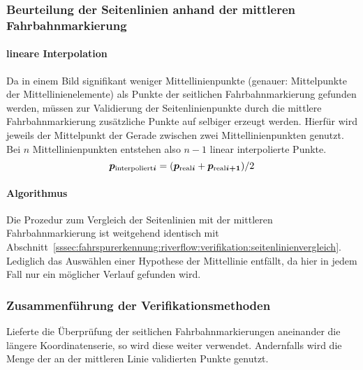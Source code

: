 \subsubsection{Beurteilung der Seitenlinien anhand der mittleren Fahrbahnmarkierung}
\paragraph{lineare Interpolation}
Da in einem Bild signifikant weniger Mittellinienpunkte (genauer: Mittelpunkte der Mittellinienelemente) als Punkte der seitlichen Fahrbahnmarkierung gefunden werden, müssen zur Validierung der Seitenlinienpunkte durch die mittlere Fahrbahnmarkierung zusätzliche Punkte auf selbiger erzeugt werden. Hierfür wird jeweils der Mittelpunkt der Gerade zwischen zwei Mittellinienpunkten genutzt. Bei \( n \) Mittellinienpunkten entstehen also \( n-1 \) linear interpolierte Punkte.
\begin{equation}
\boldsymbol{p_{\text{interpoliert}i}} = (\boldsymbol{p_{\text{real}i}}+\boldsymbol{p_{\text{real}i+1}})/2 
\end{equation}
\paragraph{Algorithmus} Die Prozedur zum Vergleich der Seitenlinien mit der mittleren Fahrbahnmarkierung ist weitgehend identisch mit Abschnitt~\ref{sssec:fahrspurerkennung:riverflow:verifikation:seitenlinienvergleich}. Lediglich das Auswählen einer Hypothese der Mittellinie entfällt, da hier in jedem Fall nur ein möglicher Verlauf gefunden wird.

\subsubsection{Zusammenführung der Verifikationsmethoden}
Lieferte die Überprüfung der seitlichen Fahrbahnmarkierungen aneinander die längere Koordinatenserie, so wird diese weiter verwendet. Andernfalls wird die Menge der an der mittleren Linie validierten Punkte genutzt.
